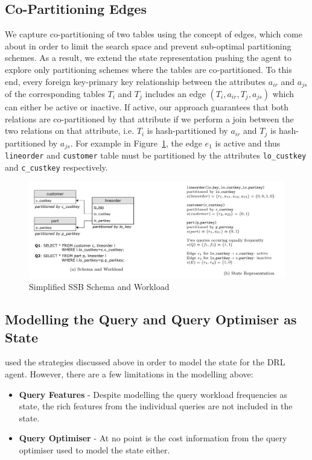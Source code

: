 \subsection{Co-Partitioning Edges}
We capture co-partitioning of two tables using the concept of edges, which come about in order to limit the search space and prevent sub-optimal partitioning schemes. As a result, we extend the state representation pushing the agent to explore only partitioning schemes where the tables are co-partitioned. To this end, every foreign key-primary key relationship between the attributes $a_{ir}$ and $a_{js}$ of the corresponding tables $T_i$ and $T_j$ includes an edge $(T_i,a_{ir},T_j,a_{js})$ which can either be active or inactive. If active, our approach guarantees that both relations are co-partitioned by that attribute if we perform a join between the two relations on that attribute, i.e. $T_i$ is hash-partitioned by $a_{ir}$ and $T_j$ is hash-partitioned by $a_{js}$. For example in Figure~\ref{fig:state-rep}, the edge $e_1$ is active and thus \texttt{lineorder} and \texttt{customer} table must be partitioned by the attributes \texttt{lo\_custkey} and \texttt{c\_custkey} respectively.



\begin{figure}[h]
  \centering
  \includegraphics[width=\linewidth]{figures/simplified-ssb-schema-workload.png}
  \caption{Simplified SSB Schema and Workload}
  \label{fig:state-rep}

\end{figure}

\subsection{Modelling the Query and Query Optimiser as State}
\citeauthor{Hilprecht:2019:TLP:3329859.3329876} used the strategies discussed above in order to model the state for the DRL agent. However, there are a few limitations in the modelling above:
\begin{itemize}
    \item \textbf{Query Features} - Despite modelling the query workload frequencies as state, the rich features from the individual queries are not included in the state. 
    \item \textbf{Query Optimiser} - At no point is the cost information from the query optimiser used to model the state either. 
\end{itemize}

